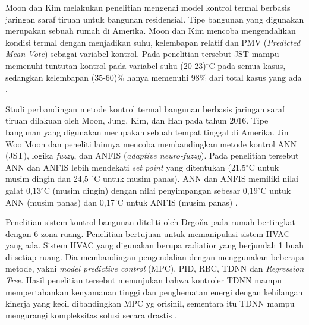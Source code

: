 Moon dan Kim melakukan penelitian mengenai model kontrol termal berbasis jaringan saraf tiruan untuk bangunan residensial. Tipe bangunan yang digunakan merupakan sebuah rumah di Amerika. Moon dan Kim mencoba mengendalikan kondisi termal dengan menjadikan suhu, kelembapan relatif dan PMV (\textit{Predicted Mean Vote}) sebagai variabel kontrol. Pada penelitian tersebut JST mampu memenuhi tuntutan kontrol pada variabel suhu (20-23)$^\circ$C pada semua kasus, sedangkan kelembapan (35-60)\% hanya memenuhi 98\% dari total kasus yang ada \cite{paper22JJkim}.

Studi perbandingan metode kontrol termal bangunan berbasis jaringan saraf tiruan dilakuan oleh Moon, Jung, Kim, dan Han pada tahun 2016. Tipe bangunan yang digunakan merupakan sebuah tempat tinggal di Amerika. Jin Woo Moon dan peneliti lainnya mencoba membandingkan metode kontrol ANN (JST), logika \textit{fuzzy}, dan ANFIS (\textit{adaptive neuro-fuzzy}). Pada penelitian tersebut ANN dan ANFIS lebih mendekati \textit{set point} yang ditentukan (21,5$^{\circ}$C untuk musim dingin dan 24,5 $^{\circ}$C untuk musim panas). ANN dan ANFIS memiliki nilai galat 0,13$^{\circ}$C (musim dingin) dengan nilai penyimpangan sebesar 0,19$^{\circ}$C untuk ANN (musim panas) dan 0,17$^{\circ}$C untuk ANFIS (musim panas) \cite{paper22SKJung}.


Penelitian sistem kontrol bangunan diteliti oleh Drgoňa pada rumah bertingkat dengan 6 zona ruang. Penelitian bertujuan untuk memanipulasi sistem HVAC yang ada. Sistem HVAC yang digunakan berupa radiatior yang berjumlah 1 buah di setiap ruang. Dia membandingan pengendalian dengan menggunakan beberapa metode, yakni \textit{model predictive control} (MPC), PID, RBC, TDNN dan \textit{Regression Tree}. Hasil penelitian tersebut menunjukan bahwa kontroler TDNN mampu mempertahankan kenyamanan tinggi dan penghematan energi dengan kehilangan kinerja yang kecil dibandingkan MPC yg orisinil, sementara itu TDNN mampu mengurangi kompleksitas solusi secara drastis \cite{paper22JanDrgona}.

